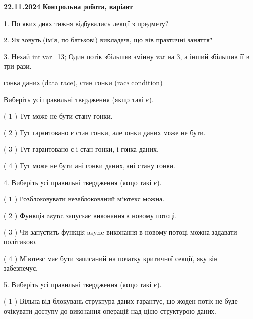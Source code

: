 \documentclass[12pt, ukrainian]{article}
\begin{document}
\vspace{4mm}
\newpage
\begin {large}

\textbf{22.11.2024 Контрольна робота, варіант  }\par


{
1. По яких днях тижня відбувались лекції з предмету?



\vspace{5mm}
2. Як зовуть (ім'я, по батькові) викладача, що вів практичні заняття?



\vspace{5mm}
3. Нехай int var=13; Один потік збільшив змінну var на 3, а інший збільшив її в три рази.

гонка даних (data race), стан гонки (race condition)

Виберіть усі правильні твердження (якщо такі є).\par
\vspace{2mm}
( 1 ) Тут може не бути стану гонки.%

( 2 ) Тут гарантовано є стан гонки, але гонки даних може не бути.%

( 3 ) Тут гарантовано є і стан гонки, і гонка даних.%

( 4 ) Тут може не бути ані гонки даних, ані стану гонки.%


\vspace{5mm}
4. Виберіть усі правильні твердження (якщо такі є).\par
\vspace{2mm}

( 1 ) Розблоковувати незаблокований м’ютекс можна.%

( 2 ) Функція async запускає виконання в новому потоці.%

( 3 ) Чи запустить функція  async виконання в новому потоці можна задавати політикою.%

( 4 ) М’ютекс має бути записаний на початку критичної секції, яку він забезпечує.%


\vspace{5mm}
5. Виберіть усі правильні твердження (якщо такі є).\par
\vspace{2mm}

( 1 ) Вільна від блокувань структура даних гарантує, що жоден потік не буде очікувати доступу до виконання операцій над цією структурою даних.%

}
\end{large}
\end{document}
